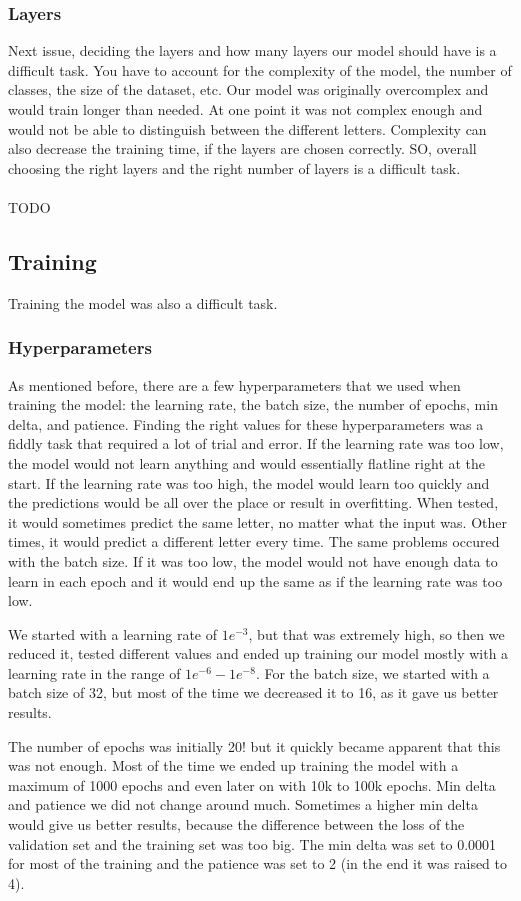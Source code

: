 \documentclass[../paper.tex]{subfiles}
\begin{document}
\subsubsection{Layers}
Next issue, deciding the layers and how many layers our model should have is a difficult task.
You have to account for the complexity of the model, the number of classes, the size of the dataset, etc.
Our model was originally overcomplex and would train longer than needed. 
At one point it was not complex enough and would not be able to distinguish between the different letters.
Complexity can also decrease the training time, if the layers are chosen correctly.
SO, overall choosing the right layers and the right number of layers is a difficult task.
\\\\
TODO
\subsection{Training}
Training the model was also a difficult task.
\subsubsection{Hyperparameters}
As mentioned before, there are a few hyperparameters that we used when training the model: the learning rate, the batch size, the number of epochs, min delta, and patience.
Finding the right values for these hyperparameters was a fiddly task that required a lot of trial and error. 
If the learning rate was too low, the model would not learn anything
and would essentially flatline right at the start. 
If the learning rate was too high, the model would learn too quickly and the predictions would be all over the place or result in overfitting.
When tested, it would sometimes predict the same letter, no matter what the input was. 
Other times, it would predict a different letter every time.
The same problems occured with the batch size. 
If it was too low, the model would not have enough data to learn in each epoch and it would end up the same as if the learning rate was too low.

We started with a learning rate of $1e^{-3}$, but that was extremely high, so then we reduced it, 
tested different values and ended up training our model mostly with a learning rate in the range of $ 1e^{-6} - 1e^{-8}$.
For the batch size, we started with a batch size of 32, 
but most of the time we decreased it to 16, as it gave us better results.

The number of epochs was initially 20! but it quickly became apparent that this was not enough. 
Most of the time we ended up training the model with a maximum of 1000 epochs and even later on with 10k to 100k epochs.
Min delta and patience we did not change around much. 
Sometimes a higher min delta would give us better results, because the difference between the loss of the validation set and the training set was too big.
The min delta was set to 0.0001 for most of the training and the patience was set to 2 (in the end it was raised to 4).
\end{document}
